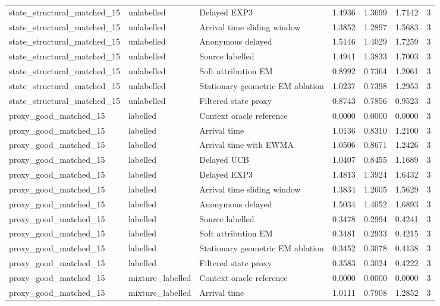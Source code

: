 \begin{tabular}{llllllr}
state\_structural\_matched\_15 & unlabelled & Delayed EXP3 & 1.4936 & 1.3699 & 1.7142 & 3 \\
state\_structural\_matched\_15 & unlabelled & Arrival time sliding window & 1.3852 & 1.2897 & 1.5683 & 3 \\
state\_structural\_matched\_15 & unlabelled & Anonymous delayed & 1.5146 & 1.4029 & 1.7259 & 3 \\
state\_structural\_matched\_15 & unlabelled & Source labelled & 1.4941 & 1.3833 & 1.7003 & 3 \\
state\_structural\_matched\_15 & unlabelled & Soft attribution EM & 0.8992 & 0.7364 & 1.2061 & 3 \\
state\_structural\_matched\_15 & unlabelled & Stationary geometric EM ablation & 1.0237 & 0.7398 & 1.2953 & 3 \\
state\_structural\_matched\_15 & unlabelled & Filtered state proxy & 0.8743 & 0.7856 & 0.9523 & 3 \\
proxy\_good\_matched\_15 & labelled & Context oracle reference & 0.0000 & 0.0000 & 0.0000 & 3 \\
proxy\_good\_matched\_15 & labelled & Arrival time & 1.0136 & 0.8310 & 1.2100 & 3 \\
proxy\_good\_matched\_15 & labelled & Arrival time with EWMA & 1.0506 & 0.8671 & 1.2426 & 3 \\
proxy\_good\_matched\_15 & labelled & Delayed UCB & 1.0407 & 0.8455 & 1.1689 & 3 \\
proxy\_good\_matched\_15 & labelled & Delayed EXP3 & 1.4813 & 1.3924 & 1.6432 & 3 \\
proxy\_good\_matched\_15 & labelled & Arrival time sliding window & 1.3834 & 1.2605 & 1.5629 & 3 \\
proxy\_good\_matched\_15 & labelled & Anonymous delayed & 1.5034 & 1.4052 & 1.6893 & 3 \\
proxy\_good\_matched\_15 & labelled & Source labelled & 0.3478 & 0.2994 & 0.4241 & 3 \\
proxy\_good\_matched\_15 & labelled & Soft attribution EM & 0.3481 & 0.2933 & 0.4215 & 3 \\
proxy\_good\_matched\_15 & labelled & Stationary geometric EM ablation & 0.3452 & 0.3078 & 0.4138 & 3 \\
proxy\_good\_matched\_15 & labelled & Filtered state proxy & 0.3583 & 0.3024 & 0.4222 & 3 \\
proxy\_good\_matched\_15 & mixture\_labelled & Context oracle reference & 0.0000 & 0.0000 & 0.0000 & 3 \\
proxy\_good\_matched\_15 & mixture\_labelled & Arrival time & 1.0111 & 0.7908 & 1.2852 & 3 \\

\end{tabular}
